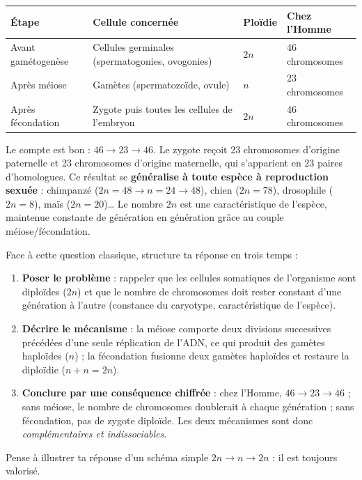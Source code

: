 \documentclass[11pt]{article}
\newcommand{\cle}[1]{{\popxbold\color{popdark}#1}}
\begin{document}
\begin{center}
\begin{tabularx}{\linewidth}{|l|X|X|X|}
\hline
\rowcolor{popblueL} \textbf{Étape} & \textbf{Cellule concernée} & \textbf{Ploïdie} & \textbf{Chez l'Homme} \\
\hline
Avant gamétogenèse & Cellules germinales (spermatogonies, ovogonies) & $2n$ & 46 chromosomes \\
\hline
Après méiose & Gamètes (spermatozoïde, ovule) & $n$ & 23 chromosomes \\
\hline
Après fécondation & Zygote puis toutes les cellules de l'embryon & $2n$ & 46 chromosomes \\
\hline
\end{tabularx}
\end{center}

Le compte est bon : $46 \rightarrow 23 \rightarrow 46$. Le zygote reçoit 23 chromosomes d'origine paternelle et 23 chromosomes d'origine maternelle, qui s'apparient en 23 paires d'homologues. Ce résultat se \textbf{généralise à toute espèce à reproduction sexuée} : chimpanzé ($2n = 48 \rightarrow n = 24 \rightarrow 48$), chien ($2n = 78$), drosophile ($2n = 8$), maïs ($2n = 20$)\dots{} Le nombre $2n$ est une \cle{caractéristique de l'espèce}, maintenue constante de génération en génération grâce au couple méiose/fécondation.

\begin{methode}
Face à cette question classique, structure ta réponse en trois temps :
\begin{enumerate}
\item \textbf{Poser le problème} : rappeler que les cellules somatiques de l'organisme sont diploïdes ($2n$) et que le nombre de chromosomes doit rester constant d'une génération à l'autre (constance du caryotype, caractéristique de l'espèce).
\item \textbf{Décrire le mécanisme} : la méiose comporte deux divisions successives précédées d'une seule réplication de l'ADN, ce qui produit des gamètes haploïdes ($n$) ; la fécondation fusionne deux gamètes haploïdes et restaure la diploïdie ($n + n = 2n$).
\item \textbf{Conclure par une conséquence chiffrée} : chez l'Homme, $46 \rightarrow 23 \rightarrow 46$ ; sans méiose, le nombre de chromosomes doublerait à chaque génération ; sans fécondation, pas de zygote diploïde. Les deux mécanismes sont donc \emph{complémentaires et indissociables}.
\end{enumerate}
Pense à illustrer ta réponse d'un schéma simple $2n \rightarrow n \rightarrow 2n$ : il est toujours valorisé.
\end{methode}
\end{document}

